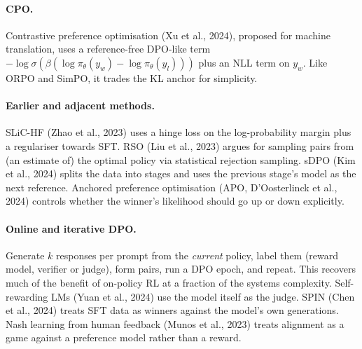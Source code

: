 \paragraph{CPO.} Contrastive preference optimisation (Xu et al., 2024), proposed for machine
translation, uses a reference-free DPO-like term $-\log\sigma(\beta(\log\pi_\theta(y_w)-\log\pi_\theta(y_l)))$
plus an NLL term on $y_w$. Like ORPO and SimPO, it trades the KL anchor for simplicity.

\paragraph{Earlier and adjacent methods.} SLiC-HF (Zhao et al., 2023) uses a hinge loss on the
log-probability margin plus a regulariser towards SFT. RSO (Liu et al., 2023) argues for
sampling pairs from (an estimate of) the optimal policy via statistical rejection sampling.
sDPO (Kim et al., 2024) splits the data into stages and uses the previous stage's model as the
next reference. Anchored preference optimisation (APO, D'Oosterlinck et al., 2024) controls whether
the winner's likelihood should go up or down explicitly.

\paragraph{Online and iterative DPO.} Generate $k$ responses per prompt from the \emph{current} policy,
label them (reward model, verifier or judge), form pairs, run a DPO epoch, and repeat. This
recovers much of the benefit of on-policy RL at a fraction of the systems complexity. Self-rewarding
LMs (Yuan et al., 2024) use the model itself as the judge. SPIN (Chen et al., 2024) treats SFT data
as winners against the model's own generations. Nash learning from human feedback (Munos et al.,
2023) treats alignment as a game against a preference model rather than a reward.

